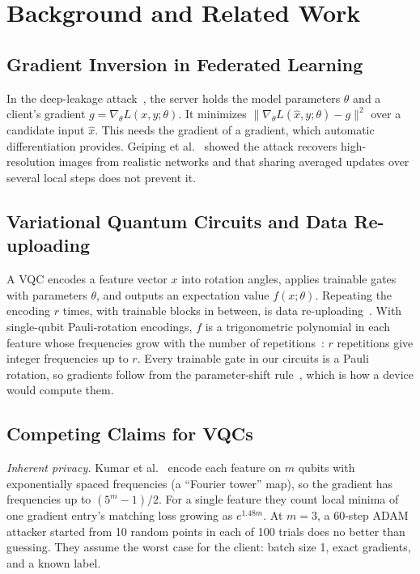 \documentclass[10pt,conference]{IEEEtran}
\begin{document}
\section{Background and Related Work}
\subsection{Gradient Inversion in Federated Learning}
In the deep-leakage attack~\cite{zhu2019}, the server holds the model parameters $\theta$ and a
client's gradient $g = \nabla_\theta L(x, y;\theta)$. It minimizes
$\|\nabla_\theta L(\hat x, y; \theta) - g\|^2$ over a candidate input $\hat x$. This needs the
gradient of a gradient, which automatic differentiation provides. Geiping et
al.~\cite{geiping2020} showed the attack recovers high-resolution images from realistic networks
and that sharing averaged updates over several local steps does not prevent it.

\subsection{Variational Quantum Circuits and Data Re-uploading}
A VQC encodes a feature vector $x$ into rotation angles, applies trainable gates with parameters
$\theta$, and outputs an expectation value $f(x;\theta)$. Repeating the encoding $r$ times, with
trainable blocks in between, is data re-uploading~\cite{perezsalinas2020}. With single-qubit
Pauli-rotation encodings, $f$ is a trigonometric polynomial in each feature whose frequencies grow
with the number of repetitions~\cite{schuld2021}: $r$ repetitions give integer frequencies up to
$r$. Every trainable gate in our circuits is a Pauli rotation, so gradients follow from the parameter-shift
rule~\cite{schuld2019}, which is how a device would compute them.

\subsection{Competing Claims for VQCs}
\emph{Inherent privacy.} Kumar et al.~\cite{kumar2023} encode each feature on $m$ qubits with
exponentially spaced frequencies (a ``Fourier tower'' map), so the gradient has frequencies up to
$(5^m-1)/2$. For a single feature they count local minima of one gradient entry's matching loss
growing as $e^{1.48m}$. At $m = 3$, a 60-step ADAM attacker started from 10 random points in each
of 100 trials does no better than guessing. They
assume the worst case for the client: batch size 1, exact gradients, and a known label.
\end{document}
